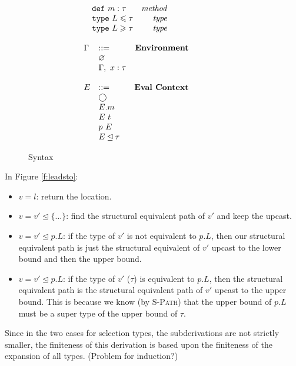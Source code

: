 \begin{figure}[h]
\[\begin{array}{lllll}
\begin{array}{llr}
		& \text{\texttt{def}} \ m:\tau						&\text{\emph{method}}\\
  		& \text{\texttt{type}} \ L \leqslant  \tau			&\text{\emph{type}}\\
  		& \text{\texttt{type}} \ L \geqslant  \tau			&\text{\emph{type}}\\
\end{array}\\
& ~~~~~~
&\\
\begin{array}{llr}
\Gamma	& :: = 													&\text{\bf{Environment}} \\
		& \varnothing 											&\\
		& \Gamma,\ x : \tau 									&\\
&&\\
E 		& :: = 													& \text{\bf{Eval Context}}\\
		& \bigcirc 												&\\
		& E.m 														&\\
		& E\ t 													&\\
		& p\ E 													&\\
		& E \unlhd \tau											&\\
\end{array}\\
\end{array}
\]
\caption{Syntax}
\label{f:syntax}
\end{figure}

In Figure \ref{f:leadsto}:
\begin{itemize}
\item
$v = l$: return the location.
\item
$v = v' \unlhd \{\ldots\}$: find the structural equivalent path of $v'$ and keep the upcast.
\item
$v = v' \unlhd p.L$: if the type of $v'$ is not equivalent to $p.L$, then our structural equivalent path is just the structural equivalent of $v'$ upcast to the lower bound and then the upper bound.
\item
$v = v' \unlhd p.L$: if the type of $v'$ ($\tau$) is equivalent to $p.L$, then the structural equivalent path is the structural equivalent path of $v'$ upcast to the upper bound. This is because we know (by \textsc{S-Path}) that the upper bound of $p.L$ must be a super type of the upper bound of $\tau$.
\end{itemize}
Since in the two cases for selection types, the subderivations are not strictly smaller, the finiteness of this derivation is based upon the finiteness of the expansion of all types. (Problem for induction?)


